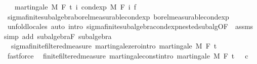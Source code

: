 \begin{isabellebody}
\ \ \ {\isachardoublequoteopen}martingale\ M\ F\ t\ {\isacharparenleft}{\kern0pt}{\isasymlambda}i{\isachardot}{\kern0pt}\ cond{\isacharunderscore}{\kern0pt}exp\ M\ {\isacharparenleft}{\kern0pt}F\ i{\isacharparenright}{\kern0pt}\ f{\isacharparenright}{\kern0pt}{\isachardoublequoteclose}\isanewline
%
\isadelimproof
\ \ %
\endisadelimproof
%
\isatagproof
{}\isamarkupfalse%
\ sigma{\isacharunderscore}{\kern0pt}finite{\isacharunderscore}{\kern0pt}subalgebra{\isachardot}{\kern0pt}borel{\isacharunderscore}{\kern0pt}measurable{\isacharunderscore}{\kern0pt}cond{\isacharunderscore}{\kern0pt}exp{\isacharprime}{\kern0pt}\ borel{\isacharunderscore}{\kern0pt}measurable{\isacharunderscore}{\kern0pt}cond{\isacharunderscore}{\kern0pt}exp\ \isanewline
\ \ \isamarkupfalse%
\ {\isacharparenleft}{\kern0pt}unfold{\isacharunderscore}{\kern0pt}locales{\isacharparenright}{\kern0pt}\ {\isacharparenleft}{\kern0pt}auto\ intro{\isacharcolon}{\kern0pt}\ sigma{\isacharunderscore}{\kern0pt}finite{\isacharunderscore}{\kern0pt}subalgebra{\isachardot}{\kern0pt}cond{\isacharunderscore}{\kern0pt}exp{\isacharunderscore}{\kern0pt}nested{\isacharunderscore}{\kern0pt}subalg{\isacharbrackleft}{\kern0pt}OF\ {\isacharunderscore}{\kern0pt}\ assms{\isacharbrackright}{\kern0pt}\ simp\ add{\isacharcolon}{\kern0pt}\ subalgebra{\isacharunderscore}{\kern0pt}F\ subalgebra{\isacharparenright}{\kern0pt}%
\endisatagproof
{\isafoldproof}%
%
\isadelimproof
\isanewline
%
\endisadelimproof
\isanewline
{}\isamarkupfalse%
\ {\isacharparenleft}{\kern0pt}\ sigma{\isacharunderscore}{\kern0pt}finite{\isacharunderscore}{\kern0pt}filtered{\isacharunderscore}{\kern0pt}measure{\isacharparenright}{\kern0pt}\ martingale{\isacharunderscore}{\kern0pt}zero{\isacharbrackleft}{\kern0pt}intro{\isacharbrackright}{\kern0pt}{\isacharcolon}{\kern0pt}\ {\isachardoublequoteopen}martingale\ M\ F\ t\ {\isacharparenleft}{\kern0pt}{\isasymlambda}{\isacharunderscore}{\kern0pt}\ {\isacharunderscore}{\kern0pt}{\isachardot}{\kern0pt}\ {}{\isacharparenright}{\kern0pt}{\isachardoublequoteclose}%
\isadelimproof
\ %
\endisadelimproof
%
\isatagproof
{}\isamarkupfalse%
\ fastforce%
\endisatagproof
{\isafoldproof}%
%
\isadelimproof
%
\endisadelimproof
\isanewline
\isanewline
{}\isamarkupfalse%
\ {\isacharparenleft}{\kern0pt}\ finite{\isacharunderscore}{\kern0pt}filtered{\isacharunderscore}{\kern0pt}measure{\isacharparenright}{\kern0pt}\ martingale{\isacharunderscore}{\kern0pt}const{\isacharbrackleft}{\kern0pt}intro{\isacharbrackright}{\kern0pt}{\isacharcolon}{\kern0pt}\ {\isachardoublequoteopen}martingale\ M\ F\ t\ {\isacharparenleft}{\kern0pt}{\isasymlambda}{\isacharunderscore}{\kern0pt}\ {\isacharunderscore}{\kern0pt}{\isachardot}{\kern0pt}\ c{\isacharparenright}{\kern0pt}{\isachardoublequoteclose}%

\end{isabellebody}
